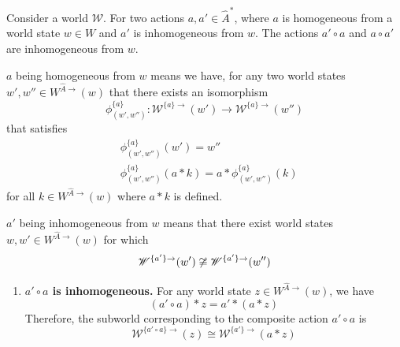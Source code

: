 
\begin{propositionE}
    \label{prp:homogeneous_and_inhomogeneous_gives_inhomogeneous}
    Consider a world $\mathscr{W}$.
    For two actions $a, a' \in \hat{A}^{*}$, where $a$ is homogeneous from a world state $w \in W$ and $a'$ is inhomogeneous from $w$.
    The actions $a' \circ a$ and $a \circ a'$ are inhomogeneous from $w$.
\end{propositionE}
\begin{proofE}
        $a$ being homogeneous from $w$ means we have, for any two world states $w', w'' \in W^{\hat{A}\to}(w)$ that there exists an isomorphism
        \begin{equation}
            \phi^{\{a\}}_{(w',w'')}: \mathscr{W}^{\{a\}\to}(w') \to \mathscr{W}^{\{a\}\to}(w'')
        \end{equation}
        that satisfies
        \begin{align}
            & \phi^{\{a\}}_{(w',w'')}(w') = w'' \\
            & \phi^{\{a\}}_{(w',w'')}(a \ast k) = a \ast \phi^{\{a\}}_{(w',w'')}(k)
        \end{align}
        for all $k \in W^{\hat{A}\to}(w)$ where $a \ast k$ is defined.

    $a'$ being inhomogeneous from $w$ means that there exist world states $w, w' \in W^{\hat{A}\to}(w)$ for which
    \begin{equation}
        \mathscr{W}^{\{a'\}\to}(w') \centernot\cong \mathscr{W}^{\{a'\}\to}(w'')
    \end{equation}

\begin{enumerate}[(1)]
    \item \textbf{$a' \circ a$ is inhomogeneous.}
    For any world state $z \in W^{\hat{A}\to}(w)$, we have
    \begin{equation}
        (a' \circ a) \ast z = a' \ast (a \ast z)
    \end{equation}
    Therefore, the subworld corresponding to the composite action $a' \circ a$ is
    \begin{equation}\label{eqn:homogeneous_and_inhomogeneous_gives_inhomogeneous_1}
        \mathscr{W}^{\{a' \circ a\}\to}(z) \cong \mathscr{W}^{\{a'\}\to}(a \ast z)
    \end{equation}


\end{enumerate}
\end{proofE}
